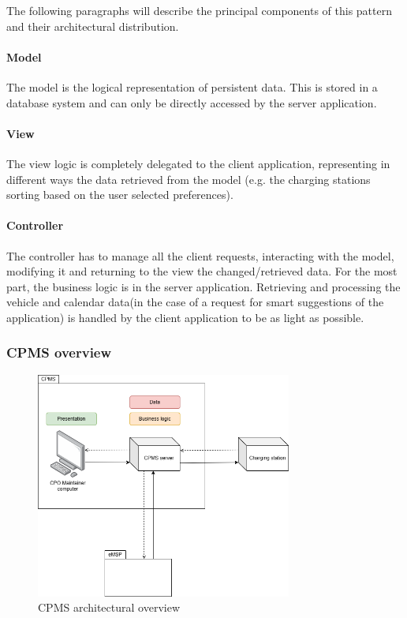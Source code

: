 The following paragraphs will describe the principal components of this pattern and their architectural distribution.

\paragraph{Model}
The model is the logical representation of persistent data. This is stored in a database system and can only be directly accessed by the server application.

\paragraph{View}
The view logic is completely delegated to the client application, representing in different ways the data retrieved from the model (e.g. the charging stations sorting based on the user selected preferences).

\paragraph{Controller}
The controller has to manage all the client requests, interacting with the model, modifying it and returning to the view the changed/retrieved data.
For the most part, the business logic is in the server application. Retrieving and processing the vehicle and calendar data(in the case of a request for smart suggestions of the application) is handled by the client application to be as light as possible.

\subsubsection{\ac{CPMS} overview}

\begin{figure}[!h]
    \begin{center}
        \includegraphics[keepaspectratio, width=0.75\textwidth]{Graphics/DD-CPMS-overview.drawio.png}
        \caption{\ac{CPMS} architectural overview}
        \label{fig:CPMS-overview-architecture}
    \end{center}
\end{figure}

